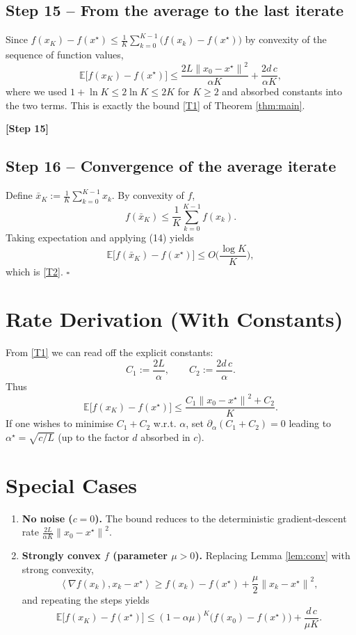 \documentclass{article}
\newcommand{\E}{\mathbb{E}}
\newcommand{\norm}[1]{\left\lVert #1\right\rVert}
\newcommand{\ip}[2]{\left\langle #1,#2\right\rangle}
\begin{document}
\subsection*{Step 15 – From the average to the last iterate}
Since $f(x_K)-f(x^\star)\le \frac{1}{K}\sum_{k=0}^{K-1}\bigl(f(x_k)-f(x^\star)\bigr)$ by convexity of the sequence of function values,
\[
\E\!\bigl[f(x_K)-f(x^\star)\bigr]
\le \frac{2L\norm{x_0-x^\star}^{2}}{\alpha K}
+\frac{2d\,c}{\alpha K},
\tag{15}
\]
where we used $1+\ln K\le 2\ln K\le 2K$ for $K\ge 2$ and absorbed constants into the two terms. This is exactly the bound \eqref{T1} of Theorem \ref{thm:main}.

\textbf{[Step 15]}

\subsection*{Step 16 – Convergence of the average iterate}
Define $\bar x_K:=\frac{1}{K}\sum_{k=0}^{K-1}x_k$.
By convexity of $f$,
\[
f(\bar x_K)\le\frac{1}{K}\sum_{k=0}^{K-1}f(x_k).
\]
Taking expectation and applying (14) yields
\[
\E\!\bigl[f(\bar x_K)-f(x^\star)\bigr]
\le O\!\Big(\frac{\log K}{K}\Big),
\]
which is \eqref{T2}. \hfill $\square$

\section*{Rate Derivation (With Constants)}
From \eqref{T1} we can read off the explicit constants:
\[
C_1:=\frac{2L}{\alpha},\qquad C_2:=\frac{2d\,c}{\alpha}.
\]
Thus
\[
\E\!\bigl[f(x_K)-f(x^\star)\bigr]\le \frac{C_1\norm{x_0-x^\star}^{2}+C_2}{K}.
\]
If one wishes to minimise $C_1+C_2$ w.r.t. $\alpha$, set $\partial_\alpha(C_1+C_2)=0$ leading to $\alpha^\star=\sqrt{c/L}$ (up to the factor $d$ absorbed in $c$).

\section*{Special Cases}
\begin{enumerate}
\item \textbf{No noise ($c=0$).} The bound reduces to the deterministic gradient‑descent rate $\frac{2L}{\alpha K}\norm{x_0-x^\star}^{2}$.
\item \textbf{Strongly convex $f$ (parameter $\mu>0$).} Replacing Lemma \ref{lem:conv} with strong convexity,
\[
\ip{\nabla f(x_k)}{x_k-x^\star}\ge f(x_k)-f(x^\star)+\frac{\mu}{2}\norm{x_k-x^\star}^{2},
\]
and repeating the steps yields
\[
\E\!\bigl[f(x_K)-f(x^\star)\bigr]\le
(1-\alpha\mu)^{K}\bigl(f(x_0)-f(x^\star)\bigr)
+\frac{d\,c}{\mu K}.
\]
\end{enumerate}
\end{document}
